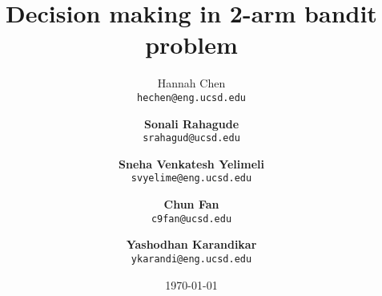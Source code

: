 \documentclass{article} %
\title{Decision making in 2-arm bandit problem}
\author{Hannah Chen \\
  \texttt{hechen@eng.ucsd.edu} \and \textbf{Sonali Rahagude}\\
  \texttt{srahagud@ucsd.edu} \and \textbf{Sneha Venkatesh Yelimeli}\\
  \texttt{svyelime@eng.ucsd.edu} \and \textbf{Chun Fan}\\
  \texttt{c9fan@ucsd.edu} \and \textbf{Yashodhan Karandikar}\\
  \texttt{ykarandi@eng.ucsd.edu}}
\date{\today}
\begin{document}
\maketitle



%




{}

\end{document}
